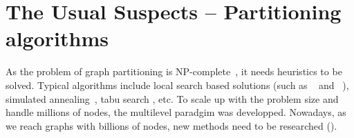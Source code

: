 \documentclass[11pt,a4paper]{report} %
\theoremstyle{customdef}
\newtheorem{definition}{Definition}
\newenvironment{defi}[2]
 {\begin{definition}[#1]\label{#2}\end{definition}\begin{siderules}}
 {\end{siderules}}
\begin{document}








\section{The Usual Suspects -- Partitioning algorithms}\label{sec:part-algo}
As the problem of graph partitioning is NP-complete~\citep{Garey1976}, it needs heuristics to be solved.
Typical algorithms include local search based solutions (such as ~\citep{Kernighan1970} and ~\citep{Fiduccia1982}), simulated annealing~\citep{Johnson1989}, %
tabu search \citep{Pirlot1996}, etc.
To scale up with the problem size and handle millions of nodes, the multilevel paradgim was developped.
Nowadays, as we reach graphs with billions of nodes, new methods need to be researched (\citep{Tsourakakis2014, export:183714}).
\end{document}
